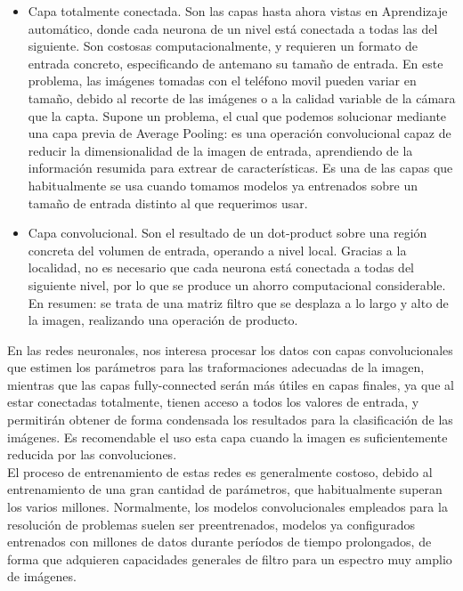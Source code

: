 \begin{itemize}
	\item Capa totalmente conectada. Son las capas hasta ahora vistas en Aprendizaje automático, donde cada neurona de un nivel está conectada a todas las del siguiente. Son costosas computacionalmente, y requieren un formato de entrada concreto, especificando de antemano su tamaño de entrada. En este problema, las imágenes tomadas con el teléfono movil pueden variar en tamaño, debido al recorte de las imágenes o a la calidad variable de la cámara que la capta. Supone un problema, el cual que podemos solucionar mediante una capa previa de Average Pooling: es una operación convolucional capaz de reducir la dimensionalidad de la imagen de entrada, aprendiendo de la información resumida para extrear de características. Es una de las capas que habitualmente se usa cuando tomamos modelos ya entrenados sobre un tamaño de entrada distinto al que requerimos usar.
	\item Capa convolucional. Son el resultado de un dot-product sobre una región concreta del volumen de entrada, operando a nivel local. Gracias a la localidad, no es necesario que cada neurona está conectada a todas del siguiente nivel, por lo que se produce un ahorro computacional considerable. En resumen: se trata de una matriz filtro que se desplaza a lo largo y alto de la imagen, realizando una operación de producto.
\end{itemize}

En las redes neuronales, nos interesa procesar los datos con capas convolucionales que estimen los parámetros para las traformaciones adecuadas de la imagen, mientras que las capas fully-connected serán más útiles en capas finales, ya que al estar conectadas totalmente, tienen acceso a todos los valores de entrada, y permitirán obtener de forma condensada los resultados para la clasificación de las imágenes. Es recomendable el uso esta capa cuando la imagen es suficientemente reducida por las convoluciones.\\

El proceso de entrenamiento de estas redes es generalmente costoso, debido al entrenamiento de una gran cantidad de parámetros, que habitualmente superan los varios millones. Normalmente, los modelos convolucionales empleados para la resolución de problemas suelen ser preentrenados, modelos ya configurados entrenados con millones de datos durante períodos de tiempo prolongados, de forma que adquieren capacidades generales de filtro para un espectro muy amplio de imágenes.\\

